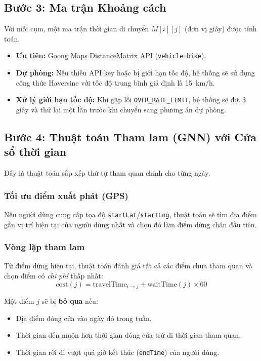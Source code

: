 \documentclass[12pt,a4paper]{report}
\begin{document}
\subsection{Bước 3: Ma trận Khoảng cách}

Với mỗi cụm, một ma trận thời gian di chuyển $M[i][j]$ (đơn vị giây) được tính toán.

\begin{itemize}
    \item \textbf{Ưu tiên:} Goong Maps DistanceMatrix API (\texttt{vehicle=bike}).
    \item \textbf{Dự phòng:} Nếu thiếu API key hoặc bị giới hạn tốc độ, hệ thống sẽ sử dụng công thức Haversine với tốc độ trung bình giả định là 15~km/h.
    \item \textbf{Xử lý giới hạn tốc độ:} Khi gặp lỗi \texttt{OVER\_RATE\_LIMIT}, hệ thống sẽ đợi 3 giây và thử lại một lần trước khi chuyển sang phương án dự phòng.
\end{itemize}

\subsection{Bước 4: Thuật toán Tham lam (GNN) với Cửa sổ thời gian}

Đây là thuật toán sắp xếp thứ tự tham quan chính cho từng ngày.

\subsubsection{Tối ưu điểm xuất phát (GPS)}
Nếu người dùng cung cấp tọa độ \texttt{startLat}/\texttt{startLng}, thuật toán sẽ tìm địa điểm gần vị trí hiện tại của người dùng nhất và chọn đó làm điểm dừng chân đầu tiên.

\subsubsection{Vòng lặp tham lam}
Từ điểm dừng hiện tại, thuật toán đánh giá tất cả các điểm chưa tham quan và chọn điểm có \emph{chi phí} thấp nhất:
\begin{equation}
\text{cost}(j) = \text{travelTime}_{i \to j} + \text{waitTime}(j) \times 60
\end{equation}

Một điểm $j$ sẽ bị \textbf{bỏ qua} nếu:
\begin{itemize}
    \item Địa điểm đóng cửa vào ngày đó trong tuần.
    \item Thời gian đến muộn hơn thời gian đóng cửa trừ đi thời gian tham quan.
    \item Thời gian rời đi vượt quá giờ kết thúc (\texttt{endTime}) của người dùng.
\end{itemize}
\end{document}

